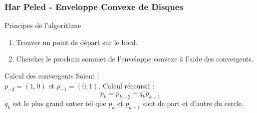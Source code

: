 


\begin{frame}
\frametitle{Har Peled - Enveloppe Convexe de Disques}

\begin{block}{Principes de l'algorithme}
  \begin{enumerate}
    \item Trouver un point de départ sur le bord.\\
    \item Chercher le prochain sommet de l'enveloppe convexe à l'aide des convergents.\\
  \end{enumerate}
\end{block}

\begin{block}{Calcul des convergents}
  Soient :\\
  $p_{-2} = (1,0)$ et $p_{-1} = (0,1)$.
  Calcul réccursif : \\
  \alert{$$p_{k} = p_{k-2} + q_k p_{k-1}$$}
  $q_k$ est le plus grand entier tel que $p_{k}$ et $p_{k-1}$ sont de part et d'autre du cercle.
\end{block}
\end{frame}

